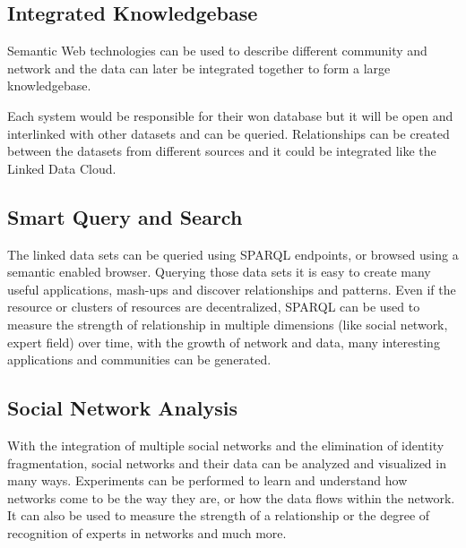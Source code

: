 \subsection{Integrated Knowledgebase}

Semantic Web technologies can be used to describe different community and network and the data can later be integrated together to form a large knowledgebase.

Each system would be responsible for their won database but it will be open and interlinked with other datasets and can be queried. Relationships can be created between the datasets from different sources and it could be integrated like the Linked Data Cloud.

\subsection{Smart Query and Search}

The linked data sets can be queried using SPARQL \cite{prud2008sparql} endpoints, or browsed using a semantic enabled browser. Querying those data sets it is easy to create many useful applications, mash-ups and discover relationships and patterns. Even if the resource or clusters of resources are decentralized, SPARQL can be used to measure the strength of relationship in multiple dimensions (like social network, expert field) over time, with the growth of network and data, many interesting applications and communities can be generated.


\subsection{Social Network Analysis}

With the integration of multiple social networks and the elimination of identity fragmentation, social networks and their data can be analyzed and visualized in many ways. Experiments can be performed to learn and understand how networks come to be the way they are, or how the data flows within the network. It can also be used to measure the strength of a relationship or the degree of recognition of experts in networks and much more.